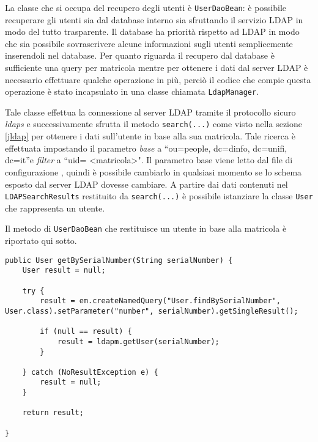 La classe che si occupa del recupero degli utenti è \texttt{UserDaoBean}: è possibile recuperare gli utenti sia dal database interno sia sfruttando il servizio LDAP in modo del tutto trasparente.
Il database ha priorità rispetto ad LDAP in modo che sia possibile sovrascrivere alcune informazioni sugli utenti semplicemente inserendoli nel database. Per quanto riguarda il recupero dal database è sufficiente una query per matricola 
mentre per ottenere i dati dal server LDAP è necessario effettuare qualche operazione in più, perciò il codice che compie questa operazione è stato incapsulato in una classe chiamata \texttt{LdapManager}.

Tale classe effettua la connessione al server LDAP tramite il protocollo sicuro \textsl{ldaps} e successivamente sfrutta il metodo \texttt{search(...)} come visto nella sezione \ref{jldap} per ottenere i dati sull'utente in base alla sua matricola.
Tale ricerca è effettuata impostando il parametro \textsl{base} a ``ou=people, dc=dinfo, dc=unifi, dc=it''e \textsl{filter} a ``uid= \textless matricola\textgreater{}". Il parametro base viene letto dal file di configurazione 
, quindi è possibile cambiarlo in qualsiasi momento se lo schema esposto dal server LDAP dovesse cambiare.
A partire dai dati contenuti nel \texttt{LDAPSearchResults} restituito da \texttt{search(...)} è possibile istanziare la classe \texttt{User} che rappresenta un utente.

Il metodo di \texttt{UserDaoBean} che restituisce un utente in base alla matricola è riportato qui sotto.

\begin{lstlisting}
public User getBySerialNumber(String serialNumber) {
	User result = null;
	
	try {
		result = em.createNamedQuery("User.findBySerialNumber", User.class).setParameter("number", serialNumber).getSingleResult();
		
		if (null == result) {
			result = ldapm.getUser(serialNumber);
		}
		
	} catch (NoResultException e) {
		result = null;
	}

	return result;

}
\end{lstlisting}



